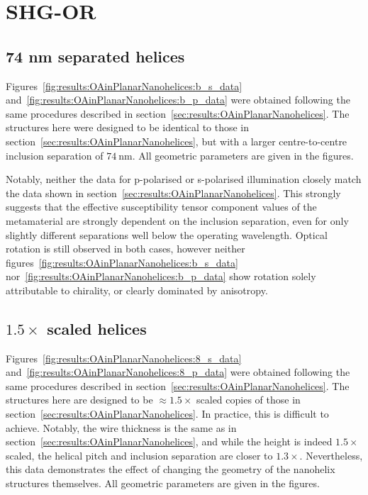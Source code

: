 \section{SHG-OR}\label{sec:appendix:AdditionalHelixOR}

\subsection{74 nm separated helices}
Figures~\ref{fig:results:OAinPlanarNanohelices:b_s_data} and~\ref{fig:results:OAinPlanarNanohelices:b_p_data} were obtained following the same procedures described in section~\ref{sec:results:OAinPlanarNanohelices}. The structures here were designed to be identical to those in section~\ref{sec:results:OAinPlanarNanohelices}, but with a larger centre-to-centre inclusion separation of $\SI{74}{\nano\m}$. All geometric parameters are given in the  figures.

Notably, neither the data for p-polarised or s-polarised illumination closely match the data shown in section~\ref{sec:results:OAinPlanarNanohelices}. This strongly suggests that the effective susceptibility tensor component values of the metamaterial are strongly dependent on the inclusion separation, even for only slightly different separations well below the operating wavelength. Optical rotation is still observed in both cases, however neither figures~\ref{fig:results:OAinPlanarNanohelices:b_s_data} nor~\ref{fig:results:OAinPlanarNanohelices:b_p_data} show rotation solely attributable to chirality, or clearly dominated by anisotropy.

\subsection{$1.5 \times$ scaled helices}
Figures~\ref{fig:results:OAinPlanarNanohelices:8_s_data} and~\ref{fig:results:OAinPlanarNanohelices:8_p_data} were obtained following the same procedures described in section~\ref{sec:results:OAinPlanarNanohelices}. The structures here are designed to be $\approx 1.5 \times$ scaled copies of those in section~\ref{sec:results:OAinPlanarNanohelices}. In practice, this is difficult to achieve. Notably, the wire thickness is the same as in section~\ref{sec:results:OAinPlanarNanohelices}, and while the height is indeed $1.5 \times$ scaled, the helical pitch and inclusion separation are closer to $1.3 \times$.  Nevertheless, this data demonstrates the effect of changing the geometry of the nanohelix structures themselves. All geometric parameters are given in the  figures.

